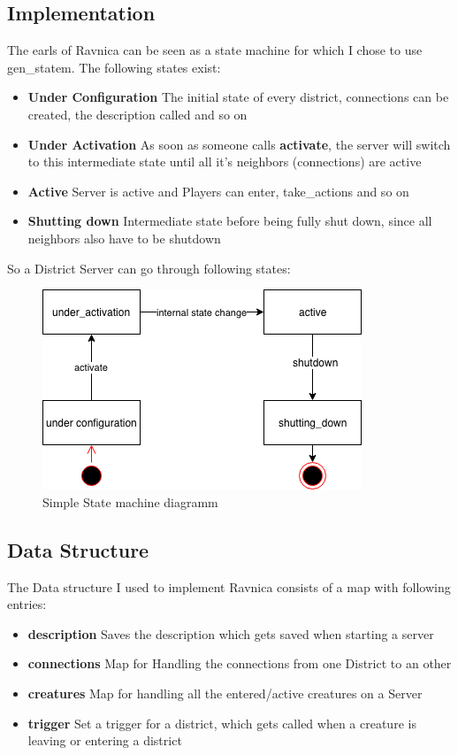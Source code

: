 \documentclass[11pt,a4paper]{article}
\begin{document}
\subsection{Implementation}
The earls of Ravnica can be seen as a state machine for which I chose to use gen\_statem.
The following states exist:
\begin{itemize}
	\item \textbf{Under Configuration} The initial state of every district, connections can be created, the description called and so on
	\item \textbf{Under Activation} As soon as someone calls \textbf{activate}, the server will switch to this intermediate state until all it's neighbors (connections) are active
	\item \textbf{Active} Server is active and Players can enter, take\_actions and so on
	\item \textbf{Shutting down} Intermediate state before being fully shut down, since all neighbors also have to be shutdown
\end{itemize}

So a District Server can go through following states:

\begin{figure}[!htb]
	\includegraphics{images/ravnica}
	\caption{Simple State machine diagramm}
\end{figure}

\subsection{Data Structure}
The Data structure I used to implement Ravnica consists of a map with following entries:
\begin{itemize}
	\item \textbf{description} Saves the description which gets saved when starting a server
	\item \textbf{connections} Map for Handling the connections from one District to an other
	\item \textbf{creatures} Map for handling all the entered/active creatures on a Server
	\item \textbf{trigger} Set a trigger for a district, which gets called when a creature is leaving or entering a district
\end{itemize}
\end{document}

